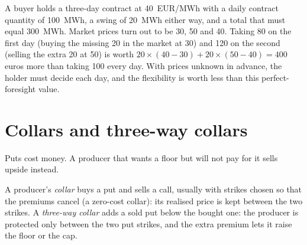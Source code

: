 \begin{example}\label{ex:m3:commodity-options-and-structured-hedges:swing}
A buyer holds a three-day contract at \qty{40}{EUR/MWh} with a daily contract quantity of 100~MWh, a swing of
20~MWh either way, and a total that must equal 300~MWh. Market prices turn out to be 30, 50 and 40. Taking 80
on the first day (buying the missing 20 in the market at 30) and 120 on the second (selling the extra 20 at
50) is worth $20 \times (40 - 30) + 20 \times (50 - 40) = 400$ euros more than taking 100 every day. With
prices unknown in advance, the holder must decide each day, and the flexibility is worth less than this
perfect-foresight value.
\end{example}

\section{Collars and three-way collars}

Puts cost money. A producer that wants a floor but will not pay for it sells upside instead.

\begin{definition}\label{def:m3:commodity-options-and-structured-hedges:collar}
A producer's \emph{collar} buys a put and sells a call, usually with strikes chosen so that
the premiums cancel (a zero-cost collar): its realised price is kept between the two strikes. A
\emph{three-way collar} adds a sold put below the bought one: the producer is
protected only between the two put strikes, and the extra premium lets it raise the floor or the cap.
\end{definition}

